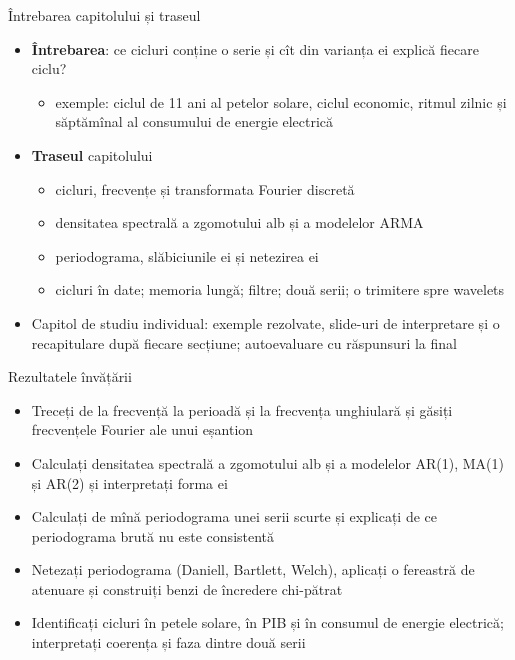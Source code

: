 \begin{frame}{Întrebarea capitolului și traseul}
\itemsize{\small}
\begin{itemize}
    \item \textbf{Întrebarea}: ce cicluri conține o serie și cît din varianța ei explică fiecare ciclu?
    \begin{itemize}
        \item exemple: ciclul de 11 ani al petelor solare, ciclul economic, ritmul zilnic și săptămînal al consumului de energie electrică
    \end{itemize}
    \item \textbf{Traseul} capitolului
    \begin{itemize}
        \item cicluri, frecvențe și transformata Fourier discretă
        \item densitatea spectrală a zgomotului alb și a modelelor ARMA
        \item periodograma, slăbiciunile ei și netezirea ei
        \item cicluri în date; memoria lungă; filtre; două serii; o trimitere spre wavelets
    \end{itemize}
    \item Capitol de studiu individual: exemple rezolvate, slide-uri de interpretare și o recapitulare după fiecare secțiune; autoevaluare cu răspunsuri la final
\end{itemize}
\end{frame}

\begin{frame}{Rezultatele învățării}
\itemsize{\small}
\begin{itemize}
    \item Treceți de la frecvență la perioadă și la frecvența unghiulară și găsiți frecvențele Fourier ale unui eșantion
    \item Calculați densitatea spectrală a zgomotului alb și a modelelor AR(1), MA(1) și AR(2) și interpretați forma ei
    \item Calculați de mînă periodograma unei serii scurte și explicați de ce periodograma brută nu este consistentă
    \item Netezați periodograma (Daniell, Bartlett, Welch), aplicați o fereastră de atenuare și construiți benzi de încredere chi-pătrat
    \item Identificați cicluri în petele solare, în PIB și în consumul de energie electrică; interpretați coerența și faza dintre două serii
\end{itemize}
\end{frame}

